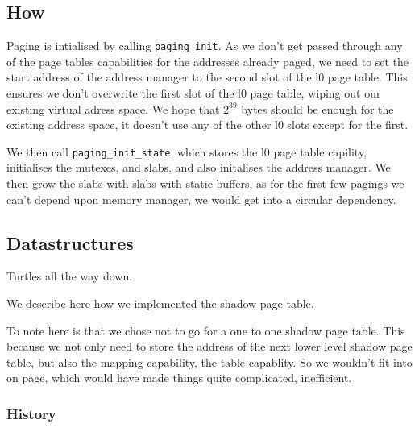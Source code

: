 \subsection{How}

Paging is intialised by calling \verb|paging_init|.
As we don't get passed through any of the page tables capabilities for the
addresses already paged, we need to set the start address of the address manager
to the second slot of the l0 page table.
This ensures we don't overwrite the first slot of the l0 page table, wiping out
our existing virtual adress space.
We hope that $2^39$ bytes should be enough for the existing address space, it
doesn't use any of the other l0 slots except for the first.

We then call \verb|paging_init_state|, which stores the l0 page table capility,
initialises the mutexes, and slabs, and also initalises the address manager.
We then grow the slabs with slabs with static buffers, as for the first few
pagings we can't depend upon memory manager, we would get into a circular
dependency.

\subsection{Datastructures}

\begin{displayquote}
Turtles all the way down.
\end{displayquote}

We describe here how we implemented the shadow page table.

To note here is that we chose not to go for a one to one shadow page table.
This because we not only need to store the address of the next lower level
shadow page table, but also the mapping capability, the table capablity. So we
wouldn't fit into on page, which would have made things quite complicated,
inefficient.

\subsubsection{History}


